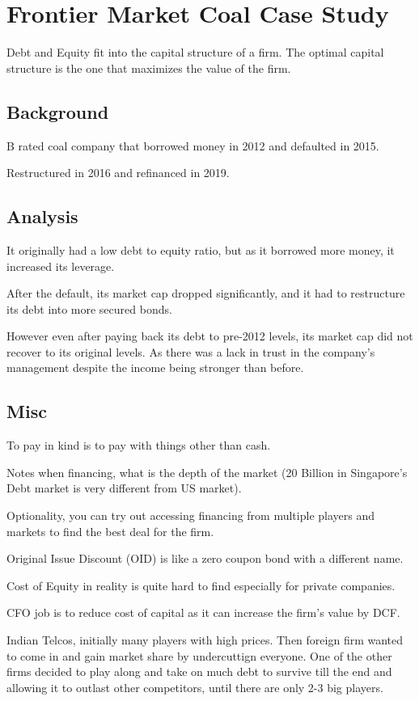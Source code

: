 \section{Frontier Market Coal Case Study}
Debt and Equity fit into the capital structure of a firm. The optimal capital structure is the one that maximizes the value of the firm.

\subsection{Background}
B rated coal company that borrowed money in 2012 and defaulted in 2015.

Restructured in 2016 and refinanced in 2019.

\subsection{Analysis}
It originally had a low debt to equity ratio, but as it borrowed more money, it increased its leverage.

After the default, its market cap dropped significantly, and it had to restructure its debt into more secured bonds.

However even after paying back its debt to pre-2012 levels, its market cap did not recover to its original levels. As there was a lack in trust in the company's management despite the income being stronger than before.

\subsection{Misc}
To pay in kind is to pay with things other than cash.

Notes when financing, what is the depth of the market (20 Billion in Singapore's Debt market is very different from US market).

Optionality, you can try out accessing financing from multiple players and markets to find the best deal for the firm.

Original Issue Discount (OID) is like a zero coupon bond with a different name.

Cost of Equity in reality is quite hard to find especially for private companies.

CFO job is to reduce cost of capital as it can increase the firm's value by DCF.

Indian Telcos, initially many players with high prices. Then foreign firm wanted to come in and gain market share by undercuttign everyone. One of the other firms decided to play along and take on much debt to survive till the end and allowing it to outlast other competitors, until there are only 2-3 big players.

